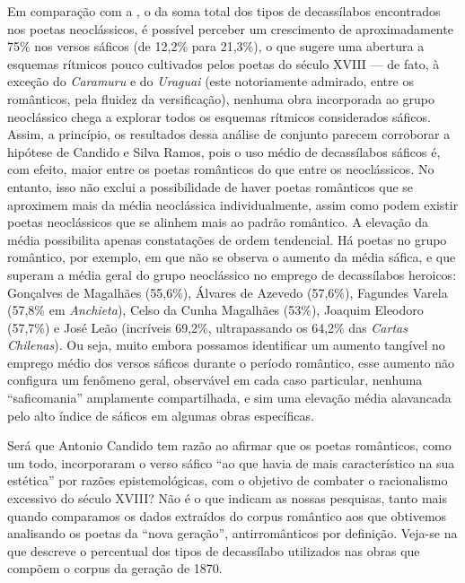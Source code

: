 \documentclass[portuguese]{textolivre}
\begin{document}
Em comparação com a , o da soma total dos tipos de decassílabos encontrados nos poetas neoclássicos, é possível perceber um crescimento de aproximadamente 75\% nos versos sáficos (de 12,2\% para 21,3\%), o que sugere uma abertura a esquemas rítmicos pouco cultivados pelos poetas do século XVIII — de fato, à exceção do \textit{Caramuru} e do \textit{Uraguai} (este notoriamente admirado, entre os românticos, pela fluidez da versificação), nenhuma obra incorporada ao grupo neoclássico chega a explorar todos os esquemas rítmicos considerados sáficos. Assim, a princípio, os resultados dessa análise de conjunto parecem corroborar a hipótese de Candido e Silva Ramos, pois o uso médio de decassílabos sáficos é, com efeito, maior entre os poetas românticos do que entre os neoclássicos. No entanto, isso não exclui a possibilidade de haver poetas românticos que se aproximem mais da média neoclássica individualmente, assim como podem existir poetas neoclássicos que se alinhem mais ao padrão romântico. A elevação da média possibilita apenas constatações de ordem tendencial. Há poetas no grupo romântico, por exemplo, em que não se observa o aumento da média sáfica, e que superam a média geral do grupo neoclássico no emprego de decassílabos heroicos: Gonçalves de Magalhães (55,6\%), Álvares de Azevedo (57,6\%), Fagundes Varela (57,8\% em \textit{Anchieta}), Celso da Cunha Magalhães (53\%), Joaquim Eleodoro (57,7\%) e José Leão (incríveis 69,2\%, ultrapassando os 64,2\% das \textit{Cartas Chilenas}). Ou seja, muito embora possamos identificar um aumento tangível no emprego médio dos versos sáficos durante o período romântico, esse aumento não configura um fenômeno geral, observável em cada caso particular, nenhuma “saficomania” amplamente compartilhada, e sim uma elevação média alavancada pelo alto índice de sáficos em algumas obras específicas.

Será que Antonio Candido tem razão ao afirmar que os poetas românticos, como um todo, incorporaram o verso sáfico “ao que havia de mais característico na sua estética” \cite[p.~36]{candido2000formacao} por razões epistemológicas, com o objetivo de combater o racionalismo excessivo do século XVIII? Não é o que indicam as nossas pesquisas, tanto mais quando comparamos os dados extraídos do corpus romântico aos que obtivemos analisando os poetas da “nova geração”, antirromânticos por definição. Veja-se na  que descreve o percentual dos tipos de decassílabo utilizados nas obras que compõem o corpus da geração de 1870.
\end{document}
